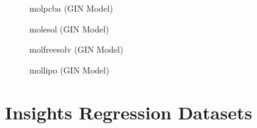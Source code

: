 \begin{figure}
    \centering
    \caption{molpcba (GIN Model)}
    \label{fig:gcn-molfreesolv}
\end{figure}

\begin{figure}
    \centering
    \caption{molesol (GIN Model)}
    \label{fig:gcn-molfreesolv}
\end{figure}

\begin{figure}
    \centering
    \caption{molfreesolv (GIN Model)}
    \label{fig:gcn-molfreesolv}
\end{figure}

\begin{figure}
    \centering
    \caption{mollipo (GIN Model)}
    \label{fig:gcn-molfreesolv}
\end{figure}
\section{Insights Regression Datasets}


